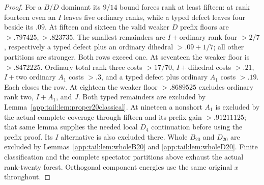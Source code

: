 \documentclass[11pt]{article}
\theoremstyle{definition}
\theoremstyle{remark}
\begin{document}
\begin{proof}
For a $B/D$ dominant its $9/14$ bound forces rank at least
fifteen: at rank fourteen even an $I$ leaves five ordinary
ranks, while a typed defect leaves four beside its $.09$.
At fifteen and sixteen the valid weaker $D$ prefix floors
are $>.797425,>.823735$. The smallest remainders are
$I+$ordinary rank four $>2/7$, respectively a typed defect
plus an ordinary dihedral $>.09+1/7$; all other partitions
are stronger. Both rows exceed one.
At seventeen the weaker floor is $>.8472225$.
Ordinary total rank three costs $>17/70$, $I+$dihedral costs
$>.21$, $I+$two ordinary $A_1$ costs $>.3$, and a typed
defect plus ordinary $A_1$ costs $>.19$. Each closes the row.
At eighteen the weaker floor $>.8689525$ excludes ordinary
rank two, $I+A_1$, and $J$. Both typed remainders are excluded
by Lemma~\ref{app:tail:lem:proper20classical}.
At nineteen a nonshort $A_1$ is excluded by the actual complete
coverage through fifteen and its prefix gain $>.91211125$;
that same lemma supplies the needed local $D_4$ continuation
before using the prefix proof. Its $I$ alternative is also
excluded there. Whole $B_{20}$ and $D_{20}$ are excluded by
Lemmas~\ref{app:tail:lem:wholeB20} and
\ref{app:tail:lem:wholeD20}.
Finite classification and the complete spectator partitions above
exhaust the actual rank-twenty forest. Orthogonal component
energies use the same original $x$ throughout.
\end{proof}
\end{document}
